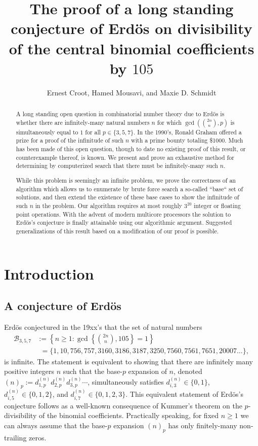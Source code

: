 \documentclass[12pt]{article}
\author{Ernest Croot, Hamed Mousavi, and Maxie D. Schmidt}
\title{The proof of a long standing conjecture of Erd\"os on divisibility of the 
       central binomial coefficients by $105$}
\begin{document}
\maketitle

\begin{abstract} 
A long standing open question in combinatorial number theory due to Erd\"os is whether there are 
infinitely-many natural numbers $n$ for which $\gcd(\binom{2n}{n}, p)$ is simultaneously equal to 
$1$ for all $p \in \{3,5,7\}$. In the 1990's, Ronald Graham offered a prize for a proof of the infinitude of such 
$n$ with a prime bounty totaling \$1000. Much has been made of this open question, though to date 
no existing proof of this result, or counterexample thereof, is known. We present and prove an 
exhaustive method for determining by computerized search that there must be infinitely-many such $n$. 

While this problem is seemingly an infinite problem, we prove the correctness of an algorithm which 
allows us to enumerate by brute force search a so-called ``base`` set of solutions, and then extend the 
existence of these base cases to show the infinitude of such $n$ in the problem. 
Our algorithm requires at most roughly $3^{20}$ integer or floating point operations. 
With the advent of modern multicore processors the solution to Erd\"os's conjecture is finally 
attainable using our algorithmic argument. 
Suggested generalizations of this result based on a modification of our proof is possible. 
\end{abstract} 

\section{Introduction} 

\subsection{A conjecture of Erd\"os} 

Erd\"os conjectured in the 19xx's that the set of natural numbers 
\begin{align*} 
\mathcal{B}_{3,5,7} & := \left\{n \geq 1: \gcd\left\{\binom{2n}{n}, 105\right\} = 1\right\} \\ 
     & \phantom{:}= 
     \{1,10,756,757,3160,3186,3187,3250,7560,7561,7651,20007\ldots\}, 
\end{align*} 
is infinite. The statement is equivalent to showing that there are infinitely many positive integers 
$n$ such that the base-$p$ expansion of $n$, denoted 
$(n)_p := d_{1,p}^{(n)} d_{2,p}^{(n)} d_{3,p}^{(n)}\cdots$, simultaneously satisfies 
$d_{i,3}^{(n)} \in \{0,1\}$, $d_{i,5}^{(n)} \in \{0,1,2\}$, and $d_{i,7}^{(n)} \in \{0,1,2,3\}$. 
This equivalent statement of Erd\"os's conjecture follows as a well-known consequence of Kummer's theorem 
on the $p$-divisibility of the binomial coefficients. 
Practically speaking, for fixed $n \geq 1$ we can always assume that the base-$p$ expansion $(n)_p$ has only 
finitely-many non-trailing zeros. 
\end{document}
